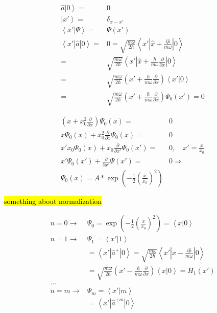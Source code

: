 		\begin{align}
			\left. \hat{a} | 0 \right\rangle =& 0 \\
			\left. | x' \right\rangle =& \delta_{x-x'} \\
			\left\langle x' | \Psi \right\rangle =& \Psi(x') \\
			\left\langle x' | \hat{a} | 0 \right\rangle =& 0 = \sqrt{\frac{m \omega}{2 \hbar}} \left\langle x' | \hat{x} + \frac{i\hat{p}}{m \omega} | 0 \right\rangle\\
			=& \sqrt{\frac{m \omega}{2 \hbar}} \left\langle x' | \hat{x} + \frac{\hbar}{m \omega}\frac{\partial}{\partial x} | 0 \right\rangle\\
			=& \sqrt{\frac{m \omega}{2 \hbar}} \left(x' + \frac{\hbar}{m \omega}\frac{\partial}{\partial x}  \right)\left\langle x' | 0 \right\rangle \\
			=& \sqrt{\frac{m \omega}{2 \hbar}} \left(x' + \frac{\hbar}{m \omega}\frac{\partial}{\partial x}  \right)\Psi_0(x') = 0
		\end{align}

		\begin{align}
			\left(x + x_0^2 \frac{\partial}{\partial x}\right)\Psi_0(x) =& 0 \\
			x\Psi_0(x) + x_0^2\frac{\partial}{\partial x}\Psi_0(x) =& 0 \\
			x'x_0\Psi_0(x) + x_0\frac{\partial}{\partial x'}\Psi_0(x') =& 0, \quad x' = \frac{x}{x_0} \\
			x'\Psi_0(x') + \frac{\partial}{\partial x'}\Psi(x') =& 0 \Rightarrow \\
			\Psi_0(x) = A * \exp\left(-\frac{1}{2}\left(\frac{x}{x_0}\right)^2\right)
		\end{align}
	
		\hl{something about normalization}
		
		
		\begin{align}
			n = 0 \rightarrow& \Psi_0 = \exp\left(-\frac{1}{2}\left(\frac{x}{x_0}\right)^2\right)  = \left\langle x | 0 \right\rangle \\
			n = 1 \rightarrow& \Psi_1 = \left\langle x' | 1 \right\rangle\\ 
			&=\left\langle x' | \hat{a}^+ | 0 \right\rangle = \sqrt{\frac{m\omega}{2\hbar}}\left\langle x' | x - \frac{i\hat{p}}{m\omega} | 0 \right\rangle\\
			&=\sqrt{\frac{m\omega}{2\hbar}}\left(x' - \frac{\hbar}{m\omega}\frac{\partial}{\partial x}\right) \left\langle x | 0 \right\rangle = H_1(x') \\
			...&\nonumber \\
			n = m \rightarrow& \Psi_m = \left\langle x' | m \right\rangle\\ 
			&=\left\langle x' | \hat{a}^{+m} | 0 \right\rangle
		\end{align}


